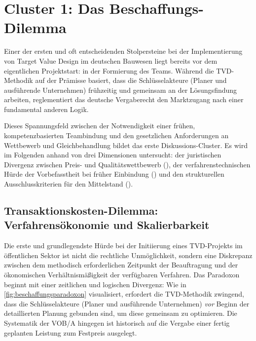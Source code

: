 \section{Cluster 1: Das Beschaffungs-Dilemma}
\label{sec:5.1}

Einer der ersten und oft entscheidenden Stolpersteine bei der Implementierung von Target Value Design im deutschen Bauwesen liegt bereits vor dem eigentlichen Projektstart: in der Formierung des Teams. Während die \acs{TVD}-Methodik auf der Prämisse basiert, dass die Schlüsselakteure (Planer und ausführende Unternehmen) frühzeitig und gemeinsam an der Lösungsfindung arbeiten, reglementiert das deutsche Vergaberecht den Marktzugang nach einer fundamental anderen Logik.

Dieses Spannungsfeld zwischen der Notwendigkeit einer frühen, kompetenzbasierten Teambindung und den gesetzlichen Anforderungen an Wettbewerb und Gleichbehandlung bildet das erste Diskussions-Cluster. Es wird im Folgenden anhand von drei Dimensionen untersucht: der juristischen Divergenz zwischen Preis- und Qualitätswettbewerb (), der verfahrenstechnischen Hürde der Vorbefasstheit bei früher Einbindung () und den strukturellen Ausschlusskriterien für den Mittelstand ().

\subsection{Transaktionskosten-Dilemma: Verfahrensökonomie und Skalierbarkeit}
\label{sec:5.1.1}

Die erste und grundlegendste Hürde bei der Initiierung eines \acs{TVD}-Projekts im öffentlichen Sektor ist nicht die rechtliche Unmöglichkeit, sondern eine Diskrepanz zwischen dem methodisch erforderlichen Zeitpunkt der Beauftragung und der ökonomischen Verhältnismäßigkeit der verfügbaren Verfahren.
Das Paradoxon beginnt mit einer zeitlichen und logischen Divergenz: Wie in \cref{fig:beschaffungsparadoxon} visualisiert, erfordert die \acs{TVD}-Methodik zwingend, dass die Schlüsselakteure (Planer und ausführende Unternehmen) \textit{vor} Beginn der detaillierten Planung gebunden sind, um diese gemeinsam zu optimieren. Die Systematik der \acs{VOB}/A hingegen ist historisch auf die Vergabe einer fertig geplanten Leistung zum Festpreis ausgelegt.


